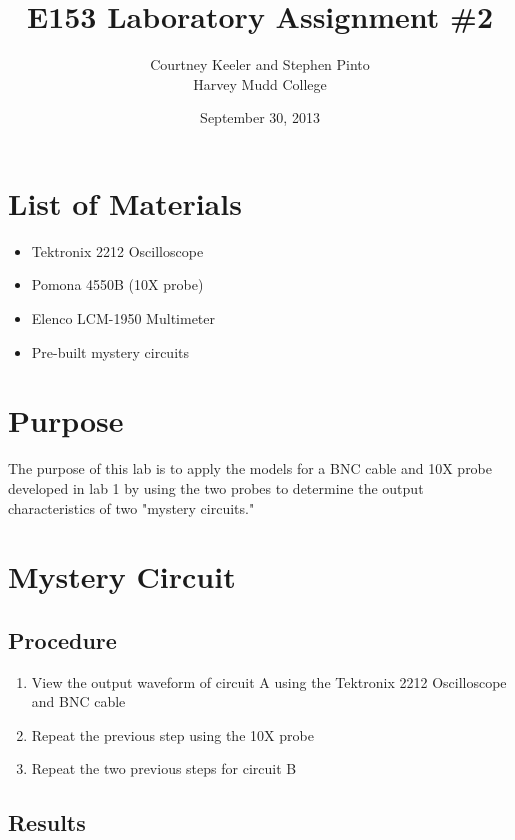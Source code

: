 \documentclass[12pt,letterpaper]{report}
\begin{document}
\title{E153 Laboratory Assignment \#2}
\author{Courtney Keeler and Stephen Pinto\\
Harvey Mudd College}
\date{September 30, 2013}
\maketitle

\section*{List of Materials}
\begin{itemize}
	\item Tektronix 2212 Oscilloscope
	\item Pomona 4550B (10X probe)
	\item Elenco LCM-1950 Multimeter
	\item Pre-built mystery circuits
\end{itemize}

\section*{Purpose}
The purpose of this lab is to apply the models for a BNC cable and 10X probe developed in lab 1 by using the two probes to determine the output characteristics of two "mystery circuits."

\section*{Mystery Circuit}
\subsection*{Procedure}

\begin{enumerate}
\item View the output waveform of circuit A using the Tektronix 2212 Oscilloscope and BNC cable
\item Repeat the previous step using the 10X probe
\item Repeat the two previous steps for circuit B
\end{enumerate}

\subsection*{Results}
\end{document}
